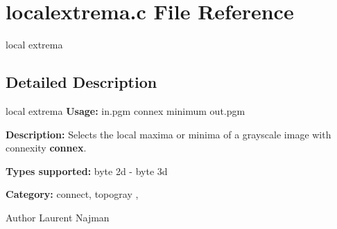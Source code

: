 \section{localextrema.c File Reference}
\label{localextrema_8c}


local extrema  




\subsection{Detailed Description}
local extrema {\bfseries Usage:} in.pgm connex minimum out.pgm

{\bfseries Description:} Selects the local maxima or minima of a grayscale image with connexity {\bfseries connex}.

{\bfseries Types supported:} byte 2d -\/ byte 3d

{\bfseries Category:} connect, topogray ,

\begin{DoxyAuthor}{Author}
Laurent Najman 
\end{DoxyAuthor}
